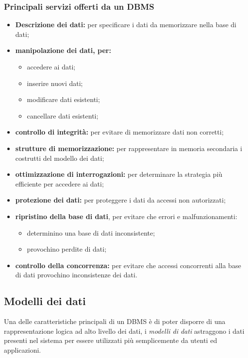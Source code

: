 \subsubsection{Principali servizi offerti da un DBMS}%
\label{ssub:Principali servizi offerti da un DBMS}
\begin{itemize}
  \item \textbf{Descrizione dei dati:} per specificare i dati da memorizzare
    nella base di dati;
  \item \textbf{manipolazione dei dati, per:}
    \begin{itemize}
      \item accedere ai dati;
      \item inserire nuovi dati;
      \item modificare dati esistenti;
      \item cancellare dati esistenti;
    \end{itemize}
  \item \textbf{controllo di integrità:} per evitare di memorizzare dati non
    corretti;
  \item \textbf{strutture di memorizzazione:} per rappresentare in memoria
    secondaria i costrutti del modello dei dati;
  \item \textbf{ottimizzazione di interrogazioni:} per determinare la strategia
    più efficiente per accedere ai dati;
  \item \textbf{protezione dei dati:} per proteggere i dati da accessi non
    autorizzati;
  \item \textbf{ripristino della base di dati}, per evitare che errori e
    malfunzionamenti:
    \begin{itemize}
      \item determinino una base di dati inconsistente;
      \item provochino perdite di dati;
    \end{itemize}
  \item \textbf{controllo della concorrenza:} per evitare che accessi
    concorrenti alla base di dati provochino inconsistenze dei dati.
\end{itemize}

\subsection{Modelli dei dati}%
\label{sub:Modelli dei dati}
Una delle caratteristiche principali di un DBMS è di poter disporre di una
rappresentazione logica ad alto livello dei dati, i \emph{modelli di dati}
astraggono i dati presenti nel sistema per essere utilizzati più semplicemente
da utenti ed applicazioni.

